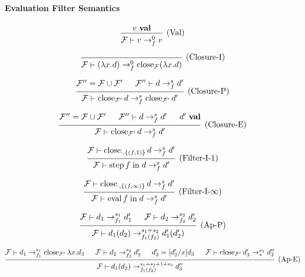 \documentclass{article}
\newcommand{\entails}{\mathrel{\mathop\vdash}}
\newcommand{\val}{~\mathbf{val}}
\DeclareMathOperator{\step}{step}
\DeclareMathOperator{\eval}{eval}
\newcommand{\fin}{\mathrel{\mathop{\text{in}}}}
\DeclareMathOperator{\fclose}{close}
\begin{document}
\paragraph{Evaluation Filter Semantics}

\[
  \begin{prooftree}
    \hypo{v \val}
    \infer1[(Val)]{\mathcal{F} \entails v \to_{f}^{0} v}
  \end{prooftree}
\]

\[
  \begin{prooftree}
    \infer0[(Closure-I)]{\mathcal{F} \entails (\lambda x .
      d) \to_{f}^{0}
  \fclose_{\mathcal{F}} (\lambda x . d)}
  \end{prooftree}
\]

\[
  \begin{prooftree}
    \hypo{\mathcal{F}'' = \mathcal{F} \cup \mathcal{F}'}
    \hypo{\mathcal{F}'' \entails d \to_{f}^{s} d'}
    \infer2[(Closure-P)]{\mathcal{F} \entails
      \fclose_{\mathcal{F}'} d \to_{f}^{s}
    \fclose_{\mathcal{F}'} d'}
  \end{prooftree}
\]

\[
  \begin{prooftree}
    \hypo{\mathcal{F}'' = \mathcal{F} \cup \mathcal{F}'}
    \hypo{\mathcal{F}'' \entails d \to_{f}^{s} d'}
    \hypo{d' \val}
    \infer3[(Closure-E)]{\mathcal{F} \entails
    \fclose_{\mathcal{F}'} d \to_{f}^{s} d'}
  \end{prooftree}
\]

\[
  \begin{prooftree}
    \hypo{\mathcal{F} \entails \fclose_{\cdot,\{(f, 1)\}} d
    \to_{f}^{s} d'}
    \infer1[(Filter-I-1)]{\mathcal{F} \entails \step f \fin
    d \to_{f}^{s} d'}
  \end{prooftree}
\]

\[
  \begin{prooftree}
    \hypo{\mathcal{F} \entails \fclose_{\cdot,\{(f,
    \infty)\}} d \to_{f}^{s} d'}
    \infer1[(Filter-I-\(\infty\))]{\mathcal{F} \entails
    \eval f \fin d \to_{f}^{s} d'}
  \end{prooftree}
\]

\[
  \begin{prooftree}
    \hypo{\mathcal{F} \entails d_1 \to_{f_1}^{s_1} d_1'}
    \hypo{\mathcal{F} \entails d_2 \to_{f_2}^{s_2} d_2'}
    \infer2[(Ap-P)]{\mathcal{F} \entails d_1 (d_2)
    \to_{f_1(f_2)}^{s_1 + s_2} d_1'(d_2')}
  \end{prooftree}
\]

\[
  \begin{prooftree}
    \hypo{
      \mathcal{F}
      \entails
      d_1 \to_{f_1}^{s_1}
        \fclose_{\mathcal{F}'} \lambda x . d_3
    }
    \hypo{\mathcal{F} \entails d_2 \to_{f_2}^{s_2} d_2'}
    \hypo{d_3' = [d_2'/x]d_3}
    \hypo{
      \mathcal{F}
      \entails
      \fclose_{\mathcal{F}'} d_3' \to_{\ast}^{s_3} d_3''
    }
    \infer4[(Ap-E)]{\mathcal{F} \entails d_1 (d_2) \to_{f_1(f_2)}^{s_1 +
    s_2 + 1 + s_3} d_3''}
  \end{prooftree}
\]
\end{document}
